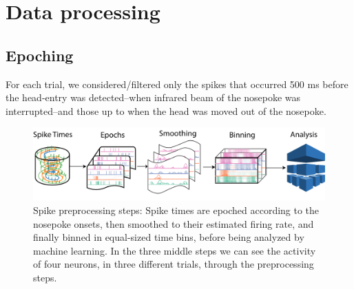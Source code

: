 \chapter{Data processing}
\label{chap:processing}

\section{Epoching}
    For each trial, we considered/filtered only the spikes that occurred 500 ms before the head-entry was detected--when infrared beam of the nosepoke was interrupted--and those up to when the head was moved out of the nosepoke. 
    
    \begin{figure}
        \centering
        \includegraphics[width=\textwidth]{figures/Pipeline.png}
        \caption[Spike preprocessing steps]{Spike preprocessing steps: Spike times are epoched according to the nosepoke onsets, then smoothed to their estimated firing rate, and finally binned in equal-sized time bins, before being analyzed by machine learning. In the three middle steps we can see the activity of four neurons, in three different trials, through the preprocessing steps.}
        \label{fig:preproc}
    \end{figure} 
    

